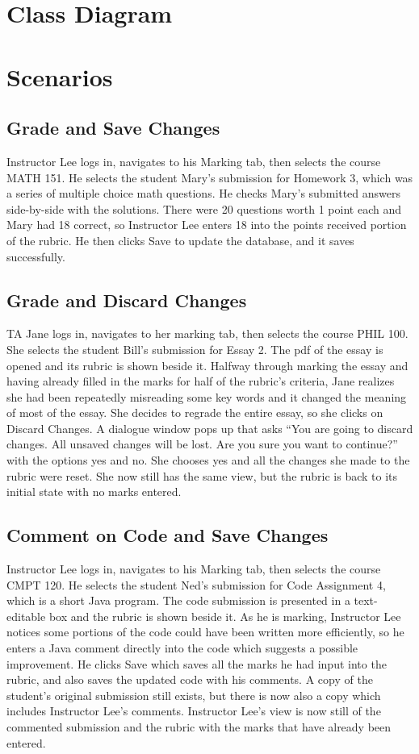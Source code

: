 \documentclass{article}
\begin{document}
\section{Class Diagram}

\section{Scenarios}
\subsection{Grade and Save Changes}
Instructor Lee logs in, navigates to his Marking tab, then selects the course MATH 151.
He selects the student Mary’s submission for Homework 3, which was a series of multiple
choice math questions. He checks Mary’s submitted answers side-by-side with the solutions.
There were 20 questions worth 1 point each and Mary had 18 correct, so Instructor
Lee enters 18 into the points received portion of the rubric. He then clicks Save to update
the database, and it saves successfully.

\subsection{Grade and Discard Changes}
TA Jane logs in, navigates to her marking tab, then selects the course PHIL 100. She
selects the student Bill’s submission for Essay 2. The pdf of the essay is opened and
its rubric is shown beside it. Halfway through marking the essay and having already
filled in the marks for half of the rubric’s criteria, Jane realizes she had been repeatedly
misreading some key words and it changed the meaning of most of the essay. She decides
to regrade the entire essay, so she clicks on Discard Changes. A dialogue window pops
up that asks “You are going to discard changes. All unsaved changes will be lost. Are you
sure you want to continue?” with the options yes and no. She chooses yes and all the
changes she made to the rubric were reset. She now still has the same view, but the
rubric is back to its initial state with no marks entered.

\subsection{Comment on Code and Save Changes}
Instructor Lee logs in, navigates to his Marking tab, then selects the course CMPT 120.
He selects the student Ned’s submission for Code Assignment 4, which is a short Java
program. The code submission is presented in a text-editable box and the rubric is shown
beside it. As he is marking, Instructor Lee notices some portions of the code could have
been written more efficiently, so he enters a Java comment directly into the code which
suggests a possible improvement. He clicks Save which saves all the marks he had input
into the rubric, and also saves the updated code with his comments. A copy of the student’s
original submission still exists, but there is now also a copy which includes Instructor Lee’s
comments. Instructor Lee’s view is now still of the commented submission and the rubric with
the marks that have already been entered.
\end{document}

